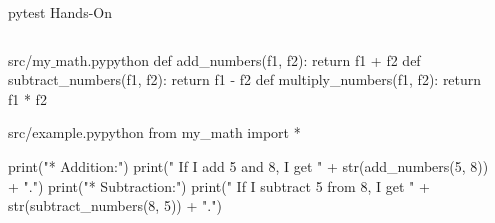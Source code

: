\documentclass{setbeamer}
\begin{document}
\begin{frame}[fragile]{pytest Hands-On}
    \begin{columns}
        \begin{column}{0.6\textwidth}
            \begin{TUMCodeBlock}{src/my$\_$math.py}{python}
def add_numbers(f1, f2):
	return f1 + f2
def subtract_numbers(f1, f2):
	return f1 - f2
def multiply_numbers(f1, f2):
	return f1 * f2
            \end{TUMCodeBlock}

            \begin{TUMCodeBlock}{src/example.py}{python}
from my_math import *

print("* Addition:")
print(" If I add 5 and 8, I get " + str(add_numbers(5, 8)) + ".")
print("* Subtraction:")
print(" If I subtract 5 from 8, I get " + str(subtract_numbers(8, 5)) + ".")
            \end{TUMCodeBlock}
        \end{column}
        \begin{column}{0.4\textwidth}

        \end{column}
    \end{columns}
\end{frame}
\end{document}
